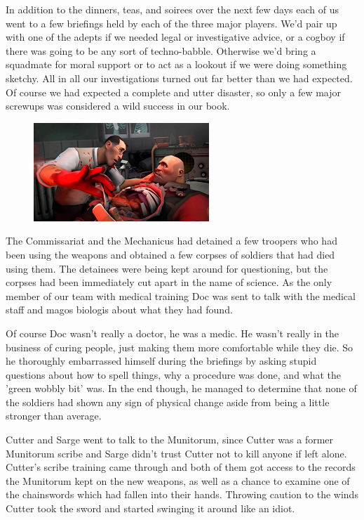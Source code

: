 In addition to the dinners, teas, and soirees over the next few days each of us went to a few briefings held by each of the three major players. 
We'd pair up with one of the adepts if we needed legal or investigative advice, or a cogboy if there was going to be any sort of techno-babble. 
Otherwise we'd bring a squadmate for moral support or to act as a lookout if we were doing something sketchy. 
All in all our investigations turned out far better than we had expected. Of course we had expected a complete and utter disaster, so only a few major screwups was considered a wild success in our book.

\begin{figure}
	\begin{center}
		\includegraphics[width=\figwidth]{pics/4/10.png}
	\end{center}
\end{figure}
The Commissariat and the Mechanicus had detained a few troopers who had been using the weapons and obtained a few corpses of soldiers that had died using them.
The detainees were being kept around for questioning, but the corpses had been immediately cut apart in the name of science. 
As the only member of our team with medical training Doc was sent to talk with the medical staff and magos biologis about what they had found.

Of course Doc wasn't really a doctor, he was a medic. 
He wasn't really in the business of curing people, just making them more comfortable while they die. 
So he thoroughly embarrassed himself during the briefings by asking stupid questions about how to spell things, why a procedure was done, and what the 'green wobbly bit' was. 
In the end though, he managed to determine that none of the soldiers had shown any sign of physical change aside from being a little stronger than average.

Cutter and Sarge went to talk to the Munitorum, since Cutter was a former Munitorum scribe and Sarge didn't trust Cutter not to kill anyone if left alone.
Cutter's scribe training came through and both of them got access to the records the Munitorum kept on the new weapons, as well as a chance to examine one of the chainswords which had fallen into their hands. 
Throwing caution to the winds Cutter took the sword and started swinging it around like an idiot.

